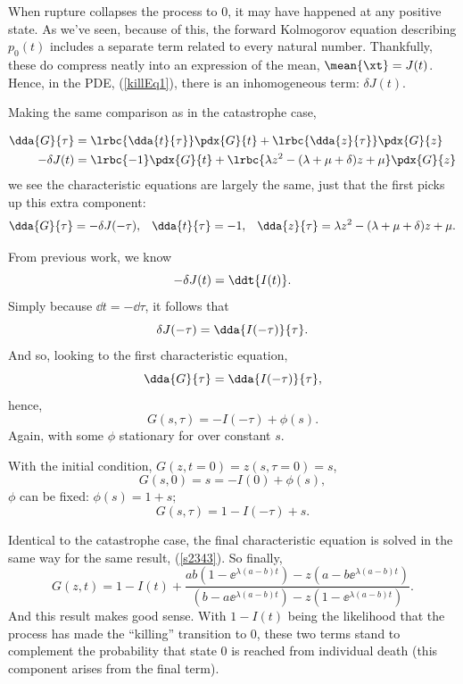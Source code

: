 When rupture collapses the process to 0, it may have happened at any positive state.  As we've seen, because of this, the forward Kolmogorov equation describing $p_0(t)$ includes a separate term related to every natural number. Thankfully, these do compress neatly into an expression of the mean, $\mean{\xt} = J(t)$. Hence, in the PDE, (\ref{killEq1}), there is an inhomogeneous term: $\delta J(t)$.\par
Making the same comparison as in the catastrophe case, 

\begin{align*}
\dda{G}{\tau} &=  \lrbc{\dda{t}{\tau}}  \pdx{G}{t}+ \lrbc{\dda{z}{\tau} }\pdx{G}{z}\\
-\delta J(t)&=  \lrbc{- 1}\pdx{G}{t} + \lrbc{\lambda z^2 -( \lambda + \mu + \delta)z + \mu} \pdx{G}{z}
\end{align*}
we see the characteristic equations are largely the same, just that the first picks up this extra component: 
\begin{align*}
\label{Char2}
\dda{G}{\tau} = -\delta J(-\tau),&& \dda{t}{\tau} = -1, && \dda{z}{\tau} = \lambda z^2 - (\lambda + \mu + \delta)z + \mu.
\end{align*}



\noindent
From previous work, we know 
$$-\delta J(t) = \ddt{I(t)}.$$
Simply because $\dd t = -\dd \tau$, it follows that 
$$\delta J(-\tau) = \dda{I(-\tau)}{\tau}.$$
And so, looking to the first characteristic equation, 
$$\dda{G}{\tau} = \dda{I(-\tau)}{\tau},$$
hence,
$$G(s,\tau) = -I(-\tau) + \phi(s).$$
Again, with some $\phi$ stationary for over constant $s$. \par
With the initial condition, $G(z, t=0) = z(s, \tau = 0) = s$,
$$G(s,0) =s= -I(0) + \phi(s),$$
$\phi$ can be fixed: $\phi(s) = 1 + s;$
$$G(s,\tau) = 1 - I(-\tau) + s.$$\par
Identical to the catastrophe case, the final characteristic equation is solved in the same way for the same result, (\ref{s2343}). So finally,
$$G(z,t) = 1 - I(t)  + \frac{ab(1-\ee^{\lambda(a-b) t}) - z(a-b\ee^{\lambda(a-b) t}) } {  (b-a\ee^{\lambda(a-b) t}) -z(1-\ee^{\lambda(a-b) t})  }.$$
And this result makes good sense. With $1 - I(t)$ being the likelihood that the process has made the ``killing'' transition to 0, these two terms stand to complement the probability that state $0$ is reached from individual death (this component arises from the final term).

